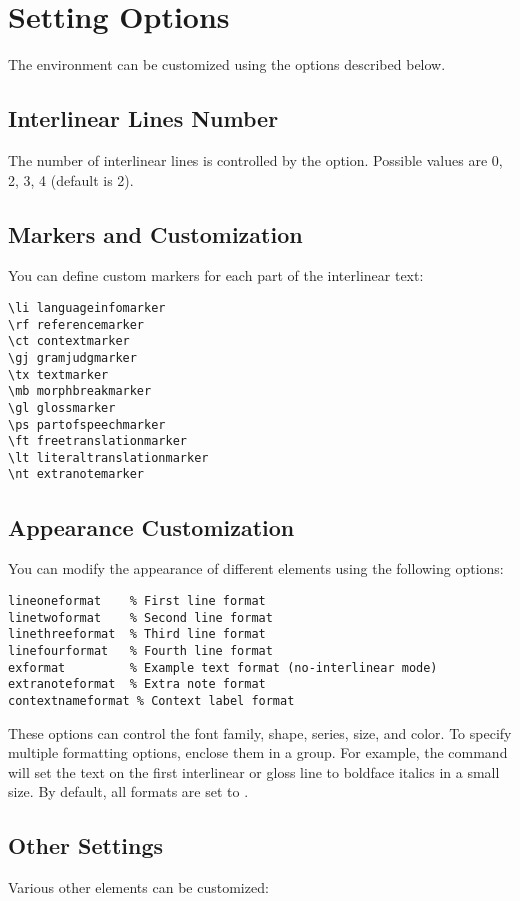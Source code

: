 \documentclass{article}
\begin{document}
\section{Setting Options}
The  environment can be customized using the options described below.

\subsection{Interlinear Lines Number}
The number of interlinear lines is controlled by the  option. Possible values are 0, 2, 3, 4 (default is 2).

\subsection{Markers and Customization}
You can define custom markers for each part of the interlinear text:
\begin{verbatim}
\li languageinfomarker
\rf referencemarker
\ct contextmarker
\gj gramjudgmarker
\tx textmarker
\mb morphbreakmarker
\gl glossmarker
\ps partofspeechmarker
\ft freetranslationmarker
\lt literaltranslationmarker
\nt extranotemarker
\end{verbatim}

\subsection{Appearance Customization}
You can modify the appearance of different elements using the following options:
\begin{verbatim}
lineoneformat    % First line format
linetwoformat    % Second line format
linethreeformat  % Third line format
linefourformat   % Fourth line format
exformat         % Example text format (no-interlinear mode)
extranoteformat  % Extra note format
contextnameformat % Context label format
\end{verbatim}

These options can control the font family, shape, series, size, and color. To specify multiple formatting options, enclose them in a group. For example, the command  will set the text on the first interlinear or gloss line to boldface italics in a small size. By default, all formats are set to .

\subsection{Other Settings}
Various other elements can be customized:
\end{document}
